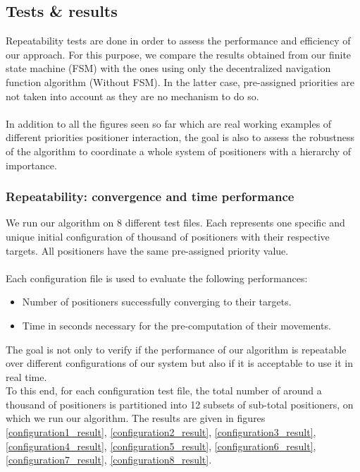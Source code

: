 \documentclass[]{spie}  %
\begin{document}
	\subsection{Tests \& results}
	\label{Test cases}
	
	Repeatability tests are done in order to assess the performance and efficiency of our approach. For this purpose, we compare the results obtained from our finite state machine (FSM) with the ones using only the decentralized navigation function algorithm (Without FSM). In the latter case, pre-assigned priorities are not taken into account as they are no mechanism to do so.\\\\
	In addition to all the figures seen so far which are real working examples of different priorities positioner interaction, the goal is also to assess the robustness of the algorithm to coordinate a whole system of positioners with a hierarchy of importance.
	
	\subsubsection{Repeatability: convergence and time performance}
	We run our algorithm on 8 different test files. Each represents one specific and unique initial configuration of thousand of positioners with their respective targets. All positioners have the same pre-assigned priority value.\\\\
	Each configuration file is used to evaluate the following performances: 
	\begin{itemize}
		\item Number of positioners successfully converging to their targets.
		\item Time in seconds necessary for the pre-computation of their movements.
	\end{itemize}
	The goal is not only to verify if the performance of our algorithm is repeatable over different configurations of our system but also if it is acceptable to use it in real time.\\
	To this end, for each configuration test file, the total number of around a thousand of positioners is partitioned into 12 subsets of sub-total positioners, on which we run our algorithm. The results are given in figures \ref{configuration1_result}, \ref{configuration2_result}, \ref{configuration3_result}, \ref{configuration4_result}, \ref{configuration5_result}, \ref{configuration6_result}, \ref{configuration7_result}, \ref{configuration8_result}.
	
\end{document}
